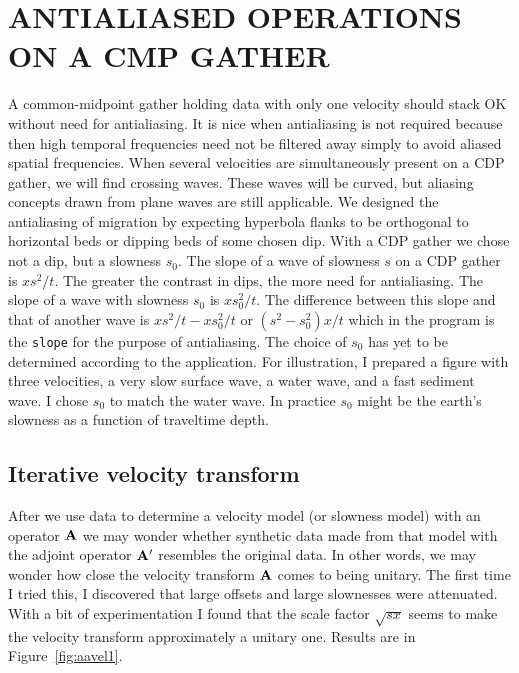 \section{ANTIALIASED OPERATIONS ON A CMP GATHER}
A common-midpoint gather holding data with only one velocity
should stack OK without need for antialiasing.
It is nice when antialiasing is not required
because then high temporal frequencies need not be filtered away
simply to avoid aliased spatial frequencies.
When several velocities are simultaneously present
on a CDP gather, we will find crossing waves.
These waves will be curved,
but aliasing concepts drawn from plane waves are still applicable.
We designed the antialiasing of migration by expecting hyperbola
flanks to be orthogonal to horizontal beds or dipping beds
of some chosen dip.
With a CDP gather we chose not a dip, but a slowness $s_0$.
The slope of a wave of slowness $s$ on a CDP gather is $xs^2/t$.
The greater the contrast in dips, the more need for antialiasing.
The slope of a wave with slowness $s_0$ is $xs_0^2/t$.
The difference between this slope and that of another wave is
$xs^2/t - xs_0^2/t$
or
$(s^2-s_0^2)x/t$
which in the program is the {\tt slope} for
the purpose of antialiasing.
The choice of $s_0$ has yet to be determined according to the application.
For illustration, I prepared a figure with three velocities,
a very slow surface wave, a water wave, and a fast sediment wave.
I chose $s_0$ to match the water wave.
In practice $s_0$ might be the earth's slowness
as a function of traveltime depth.


\subsection{Iterative velocity transform}
After we use data to determine a velocity model
(or slowness model)
with an operator $\bold A$
we may wonder whether synthetic data made from that model
with the adjoint operator $\bold A'$ resembles the original data.
In other words,
we may wonder how close the velocity transform $\bold A$
comes to being unitary.
The first time I tried this, I discovered that
large offsets and large slownesses were attenuated.
With a bit of experimentation I found that the scale factor $\sqrt{sx}$
seems to make the velocity transform approximately a unitary one.
Results are in Figure~\ref{fig:aavel1}. 

